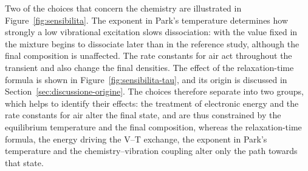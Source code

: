 Two of the choices that concern the chemistry are illustrated in
Figure~\ref{fig:sensibilita}. The exponent in Park's temperature determines
how strongly a low vibrational excitation slows dissociation: with the value
fixed in \mpp{} the mixture begins to dissociate later than in the reference
study, although the final composition is unaffected. The rate constants for
air act throughout the transient and also change the final densities. The
effect of the relaxation-time formula is shown in
Figure~\ref{fig:sensibilita-tau}, and its origin is discussed in
Section~\ref{sec:discussione-origine}. The choices therefore separate into
two groups, which helps to identify their effects: the treatment of
electronic energy and the rate constants for air alter the final state, and
are thus constrained by the equilibrium temperature and the final
composition, whereas the relaxation-time formula, the energy driving the
V--T exchange, the exponent in Park's temperature and the
chemistry--vibration coupling alter only the path towards that state.

